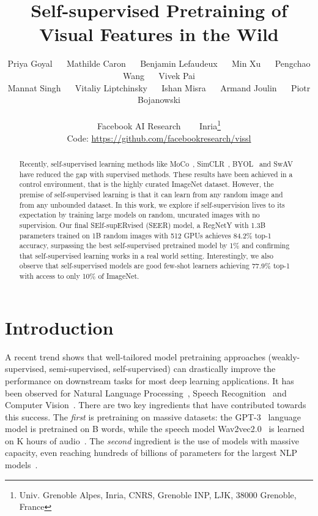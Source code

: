 \documentclass[final]{cvpr}
\begin{document}
\title{Self-supervised Pretraining of Visual Features in the Wild}

\author{
Priya Goyal
~~
Mathilde Caron
~~
Benjamin Lefaudeux
~~
Min Xu
~~
Pengchao Wang
~~
Vivek Pai
\\
Mannat Singh
~~
Vitaliy Liptchinsky
~~
Ishan Misra
~~
Armand Joulin
~~
Piotr Bojanowski
\\
\\
 Facebook AI Research ~~~  Inria\thanks{Univ. Grenoble Alpes, Inria, CNRS, Grenoble INP, LJK, 38000 Grenoble, France}
\\
\small Code: \url{https://github.com/facebookresearch/vissl}
}

\maketitle


\begin{abstract}
Recently, self-supervised learning methods like MoCo~\cite{he2020momentum}, SimCLR~\cite{chen2020simple}, BYOL~\cite{grill2020bootstrap} and SwAV~\cite{caron2020unsupervised} have reduced the gap with supervised methods.
These results have been achieved in a control environment, that is the highly curated ImageNet dataset. 
However, the premise of self-supervised learning is that it can learn from any random image and from any unbounded dataset. 
In this work, we explore if self-supervision lives to its expectation by training large models on random, uncurated images with no supervision.
Our final SElf-supERvised (SEER) model, a RegNetY with 1.3B parameters trained on 1B random images with 512 GPUs achieves 84.2\% top-1 accuracy, surpassing the best self-supervised pretrained model by 1\% and confirming that self-supervised learning works in a real world setting.
Interestingly, we also observe that self-supervised models are good few-shot learners achieving 77.9\% top-1 with access to only 10\% of ImageNet. 
\end{abstract}

\section{Introduction}

A recent trend shows that well-tailored model pretraining approaches (weakly-supervised, semi-supervised, self-supervised) can drastically improve the performance on downstream tasks for most deep learning applications.
It has been observed for Natural Language Processing~\cite{devlin2018bert,radford2019language}, Speech Recognition~\cite{riviere2020unsupervised,schneider2019wav2vec} and Computer Vision~\cite{mahajan2018exploring}.
There are two key ingredients that have contributed towards this success.
The \emph{first} is pretraining on massive datasets:
the GPT-3~\cite{brown2020language} language model is pretrained on B words, while the speech model Wav2vec2.0~\cite{baevski2020wav2vec} is learned on K hours of audio~\cite{kahn2020libri}.
The \emph{second} ingredient is the use of models with massive capacity, even  reaching hundreds of billions of parameters for the largest NLP models~\cite{brown2020language,raffel2019exploring}.
\end{document}
